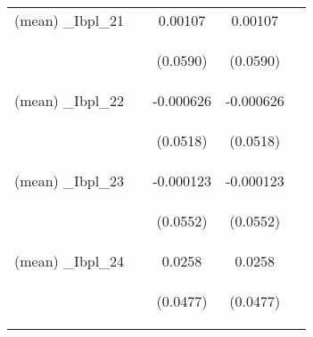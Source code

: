\documentclass[]{article}
\begin{document}
\begin{center}
\begin{tabular}{lcccc}
(mean) \_Ibpl\_21 &  & 0.00107 & 0.00107 &  \\
\vspace{4pt} & \begin{footnotesize}\end{footnotesize} & \begin{footnotesize}(0.0590)\end{footnotesize} & \begin{footnotesize}(0.0590)\end{footnotesize} & \begin{footnotesize}\end{footnotesize} \\
(mean) \_Ibpl\_22 &  & -0.000626 & -0.000626 &  \\
\vspace{4pt} & \begin{footnotesize}\end{footnotesize} & \begin{footnotesize}(0.0518)\end{footnotesize} & \begin{footnotesize}(0.0518)\end{footnotesize} & \begin{footnotesize}\end{footnotesize} \\
(mean) \_Ibpl\_23 &  & -0.000123 & -0.000123 &  \\
\vspace{4pt} & \begin{footnotesize}\end{footnotesize} & \begin{footnotesize}(0.0552)\end{footnotesize} & \begin{footnotesize}(0.0552)\end{footnotesize} & \begin{footnotesize}\end{footnotesize} \\
(mean) \_Ibpl\_24 &  & 0.0258 & 0.0258 &  \\
\vspace{4pt} & \begin{footnotesize}\end{footnotesize} & \begin{footnotesize}(0.0477)\end{footnotesize} & \begin{footnotesize}(0.0477)\end{footnotesize} & \begin{footnotesize}\end{footnotesize} \\

\end{tabular}
\end{center}
\end{document}
